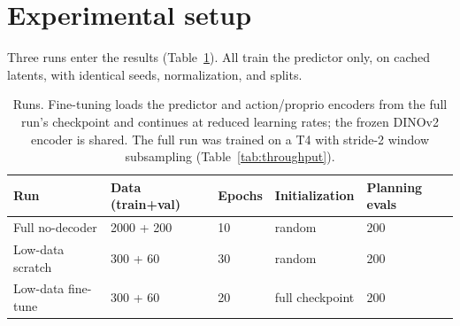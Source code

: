\documentclass[11pt,a4paper]{article}
\begin{document}
\section{Experimental setup}
\label{sec:setup}

\begin{table}[h]
\centering
\small
{}
\caption{Configuration. Precision is bf16 on A100/L4 and fp16 on T4 (Turing
emulates bf16 slowly); all runs are seed 0.}
\label{tab:config}
\end{table}

Three runs enter the results (Table~\ref{tab:runs}). All train the predictor
only, on cached latents, with identical seeds, normalization, and splits.

\begin{table}[h]
\centering
\small
\begin{tabular}{@{}lllll@{}}
\toprule
Run & Data (train+val) & Epochs & Initialization & Planning evals \\
\midrule
Full no-decoder    & 2000 + 200 & 10 & random          & 200 \\
Low-data scratch   & 300 + 60   & 30 & random          & 200 \\
Low-data fine-tune & 300 + 60   & 20 & full checkpoint & 200 \\
\bottomrule
\end{tabular}
\caption{Runs. Fine-tuning loads the predictor and action/proprio encoders
from the full run's checkpoint and continues at reduced learning rates; the
frozen DINOv2 encoder is shared. The full run was trained on a T4 with
stride-2 window subsampling (Table~\ref{tab:throughput}).}
\label{tab:runs}
\end{table}
\end{document}
